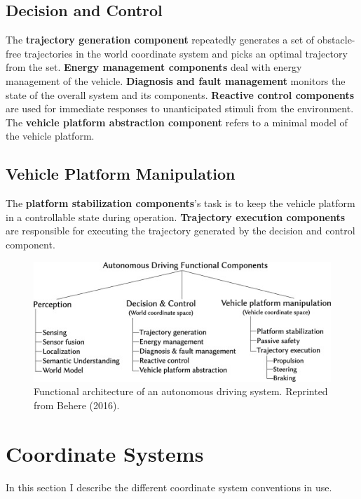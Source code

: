 \subsection{Decision and Control}
The \textbf{trajectory generation component} repeatedly generates a set of obstacle-free trajectories in the world coordinate system and picks an optimal trajectory from the set.  \textbf{Energy management components} deal with energy management of the vehicle. \textbf{Diagnosis and fault management} monitors the state of the overall system and its components. \textbf{Reactive control components} are used for immediate responses to unanticipated stimuli from the environment. The \textbf{vehicle platform abstraction component} refers to a minimal model of the vehicle platform. 

\subsection{Vehicle Platform Manipulation}

The \textbf{platform stabilization components}'s task is to keep the vehicle platform in a controllable state during operation. \textbf{Trajectory execution components} are responsible for executing the trajectory generated by the decision and control component. 

\begin{figure}
	\centering
	\includegraphics[width=5in]{figures/fav_autonomous_driving}
	\caption[FAV of Antonomous Driving System.]{\small 
		Functional architecture of an autonomous driving system. Reprinted from Behere (2016). }
	\label{fig:fav_automonous}
\end{figure}

\section{Coordinate Systems}

In this section I describe the different coordinate system conventions in use. 
	

